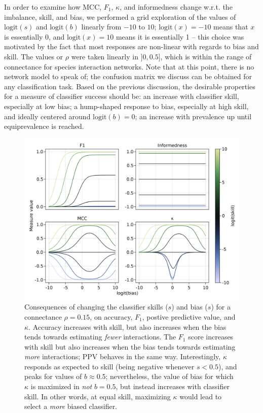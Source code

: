 \documentclass[11pt]{article}
\makeatletter
\def\maxwidth{\ifdim\Gin@nat@width>\linewidth\linewidth
\else\Gin@nat@width\fi}
\let\Oldincludegraphics\includegraphics
\renewcommand{\includegraphics}[1]{\Oldincludegraphics[width=\maxwidth]{#1}}
\makeatother
\begin{document}
In order to examine how MCC, \(F_1\), \(\kappa\), and informedness
change w.r.t. the imbalance, skill, and bias, we performed a grid
exploration of the values of \(\text{logit}(s)\) and \(\text{logit}(b)\)
linearly from \(-10\) to \(10\); \(\text{logit}(x) = -10\) means that
\(x\) is essentially 0, and \(\text{logit}(x) = 10\) means it is
essentially 1 -- this choice was motivated by the fact that most
responses are non-linear with regards to bias and skill. The values or
\(\rho\) were taken linearly in \(]0, 0.5]\), which is within the range
of connectance for species interaction networks. Note that at this
point, there is no network model to speak of; the confusion matrix we
discuss can be obtained for any classification task. Based on the
previous discussion, the desirable properties for a measure of
classifier success should be: an increase with classifier skill,
especially at low bias; a hump-shaped response to bias, especially at
high skill, and ideally centered around \(\text{logit}(b)=0\); an
increase with prevalence up until equiprevalence is reached.

\begin{figure}
\hypertarget{fig:bias}{%
\centering
\includegraphics{figures/changing-bias.png}
\caption{Consequences of changing the classifier skills (\(s\)) and bias
(\(s\)) for a connectance \(\rho=0.15\), on accuracy, \(F_1\), postive
predictive value, and \(\kappa\). Accuracy increases with skill, but
also increases when the bias tends towards estimating \emph{fewer}
interactions. The \(F_1\) score increases with skill but also increases
when the bias tends towards estimating \emph{more} interactions; PPV
behaves in the same way. Interestingly, \(\kappa\) responds as expected
to skill (being negative whenever \(s < 0.5\)), and peaks for values of
\(b \approx 0.5\); nevertheless, the value of bias for which \(\kappa\)
is maximized in \emph{not} \(b=0.5\), but instead increases with
classifier skill. In other words, at equal skill, maximizing \(\kappa\)
would lead to select a \emph{more} biased classifier.}\label{fig:bias}
}
\end{figure}
\end{document}
